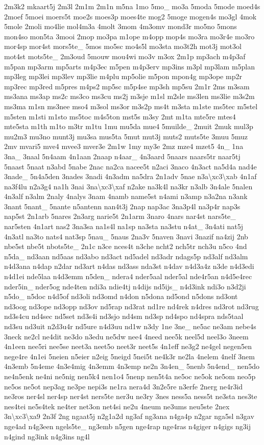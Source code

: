 \begin{DoxyCompactItemize}
2m3k2 mkaart5j 2m3l 2m1m 2m1n m5na 1mo 5mo\-\_\- mo3a 5moda 5mode moed4s 2moef 5moei moers5t moe2s moes3p moes4te mog2 5moge mogen4s mo3gl 4mok 5mole 2moli mo4lie mol4m3a 4molt 3mom 4m3omv mond3r mo5no 5mons mon4so mon5ta 3mooi 2mop mo3pa m1ope m4opp mop4s mo3ra mo3r4e mo3ro mor4sp mor4st mors5te\-\_\- 5mos mo5sc mo4s5l mo3sta mo3t2h mot3j mot3ol mot4st mots5te\-\_\- 2m3oud 5mouw mou4wi mo3v m3ox 2m1p mp3ach m4p3af m5pan mp3arm mp5arts m4p3ec m5pen m4p3erv mp3ins m3pl mp3lam m5plan mp3leg mp3lei mp3lev mp3lie m4plu mp5olie m5pon mpon4g mp3ope mp2r mp3rec mp3red m5pres m4ps2 mp5sc m5p4se mp3sh mp5su 2m1r 2ms m3sam ms3ana ms3ap ms2c ms3co ms3cu ms2j m3sje m1sl m2sle ms3len ms3lie m3s2m ms3ma m1sn ms3nee mso4 m3sol ms3or m3s2p ms4t m3sta m1ste ms5tec m5stel m5sten m1sti m1sto ms5toc m4s5ton mst5s m3sy 2mt m1ta mte5re mtes4 mte5sta m1th m1to m3tr m1tu 1mu mu5da mue4 5muilde\-\_\- 2muit 2muk mul3p mu2m3 mu3no munt3j mu3sa mus5ta 5mut mut3j muts2 muts5te 3muu 5muz 2mv mvari5 mve4 mvee3 mver3e 2m1w 1my my3e 2mz mze4 mzet5 4n\-\_\- 1na 3na\-\_\- 3naal 5n4aam 4n1aan 2naap n4aar\-\_\- 4n3aard 5naars naars5tr naar5tj 5naast 5naat n3abd 5nabe 2nac na2ca nacee5t n2aci 3naco 4n3act na5d4a nad4e 3nade\-\_\- 5n4a5den 3nades 3nadi 4n3adm na5dra 2n1adv 5nae n3a\textbackslash{}xc3\textbackslash{}xab 4n1af na3f4lu n2a3g4 na1h 3nai 3na\textbackslash{}xc3\textbackslash{}xaf n2ake na3k4l na3kr n3alb 3n4ale 5nalen 4n3alf n3alm 2naly 4nalys 3nam 4namb name5st n4ami n3amp n3a2na n3ank 3nant 5nant\-\_\- 5nante n5antenn nan4t3j 2nap nap3ac 3na3p4l na3p4r nap3s nap5st 2n1arb 5nares 2n3arg narie5t 2n1arm 3naro 4nars nar4st nars5te\-\_\- nar5sten 4n1art nas2 3na3sa na1s4l na1sp na3sta na3stu n4at\-\_\- 3n4ati nat5j 4n3atl na3to nats4 nat3sp 5nau\-\_\- 5naus 2na3v 5naven 3navi 3nazif na4zij 2nb nbe5st nbe5t nbots5te\-\_\- 2n1c n3ce nces4t n3che ncht2 nch5tr nch3u n5co 4nd n5da\-\_\- nd3aan nd5aas nd3abo nd3act nd5adel nd3adr ndags5p nd3alf nd3alm n4d3ana n4dap n2dar nd3art n4das nd3ass nda3st n4dav n4d3a4z n3de n4d3edi n4d1ei nde5laa n4d3emm n5den\-\_\- ndera4 nder5aal nder5al nde4r5an n4d5e4rec nder5in\-\_\- nder5og nde4ten ndi3a ndie4tj n4dijs nd5ijs\-\_\- n4d3ink ndi3o n3d2ji n5do\-\_\- n5doc n4d5of nd3oli nd3omd n4don n5dona nd5ond n5dons nd3ont nd3oog nd3ope nd3opp nd3ov nd5rap nd3rat nd1re nd4rek n4dres nd3rot nd3rug nd3s4cu nd4sec nd5set nd3s4i nd3sjo nd4sm nd3sp nd4spo nd4spra nds5taal nd3su nd3uit n2d3u4r nd5ure n4d3uu nd1w n3dy 1ne 3ne\-\_\- ne5ac ne3am nebe4s 3neck ne2cl ne4dit ne3do n3edu ne5dw nee4 4need nee5k neel5d neel3o 3neem 4n1een nee5ri nee5se neet3a neet5o neet3r neet5s 4n1eff ne3g2 ne4gel negen5en nege4re 4n1ei 5neien n5eier n2eig 5neigd 5nei5t ne4k3r ne2la 4nelem 4nelf 3nem 4n3emb 5n4eme 4n3e4mig 4n3emm 4n3emp ne2n 3n4en\-\_\- 5nenb 5n4end\-\_\- nen5do ne4n5enk ne4ni ne5nig nen5k4 nen1o4 5nenp nen5t4a ne5oc ne5ok ne5om neo5p ne5os ne5ot nep3ag ne3pe nepi3s ne1ra nera4d 3n2e5re n3erfe 2nerg ne4r3id ne3ros ner4sl ner4sp ner4st ners5te ner3u ne3ry 3nes ness5a ness5t ne3sta nes3te nes4tei ne5s4tek ne4ter net3on net4si ne2u 4neum ne3ums neu5ste 2nex 3n\textbackslash{}xc3\textbackslash{}xa9 2n3f 2ng ngaat5j n2g1a2d ng3af ng3ana n4ga4p n2gar nga5sl n3gav nge4ad n4g3een ngels5te\-\_\- ng3emb n5gen nge4rap nge4ras n4giger n4gigs ng3ij n4gind ng3ink n4g3ins ng4l 
\end{DoxyCompactItemize}
